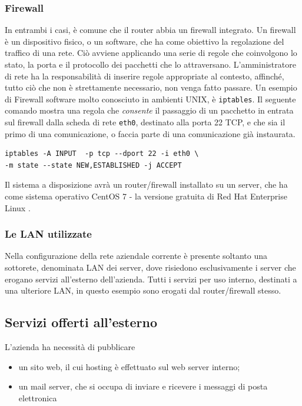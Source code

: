 \subsubsection{Firewall}
In entrambi i casi, è comune che il router abbia un firewall \cite{RFC2979} integrato.
Un firewall è un dispositivo fisico, o un software, che ha come obiettivo la regolazione del traffico di una rete.
Ciò avviene applicando una serie di regole che coinvolgono lo stato, la porta e il protocollo dei pacchetti che lo attraversano.
L'amministratore di rete ha la responsabilità di inserire regole appropriate al contesto, affinché, tutto ciò che non è strettamente necessario, non venga fatto passare.
Un esempio di Firewall software molto conosciuto in ambienti UNIX, è \lstinline[columns=fixed]{iptables}.
Il seguente comando mostra una regola che \emph{consente} il passaggio di un pacchetto in entrata sul firewall dalla scheda di rete \texttt{eth0}, destinato alla porta 22 TCP, e che sia il primo di una comunicazione, o faccia parte di una comunicazione già instaurata.

\begin{verbatim}
iptables -A INPUT  -p tcp --dport 22 -i eth0 \
-m state --state NEW,ESTABLISHED -j ACCEPT
\end{verbatim}

Il sistema a disposizione avrà un router/firewall installato su un server, che ha come sistema operativo CentOS 7 \cite{CENTOS} - la versione gratuita di Red Hat Enterprise Linux \cite{RHEL}.

\subsubsection{Le LAN utilizzate}
Nella configurazione della rete aziendale corrente è presente soltanto una sottorete, denominata LAN dei server, dove risiedono esclusivamente i server che erogano servizi all'esterno dell'azienda. Tutti i servizi per uso interno, destinati a una ulteriore LAN, in questo esempio sono erogati dal router/firewall stesso.

\subsection{Servizi offerti all'esterno}
L'azienda ha necessità di pubblicare
\begin{itemize}
    \item un sito web, il cui hosting è effettuato sul web server interno;
    \item un mail server, che si occupa di inviare e ricevere i messaggi di posta elettronica
\end{itemize}
